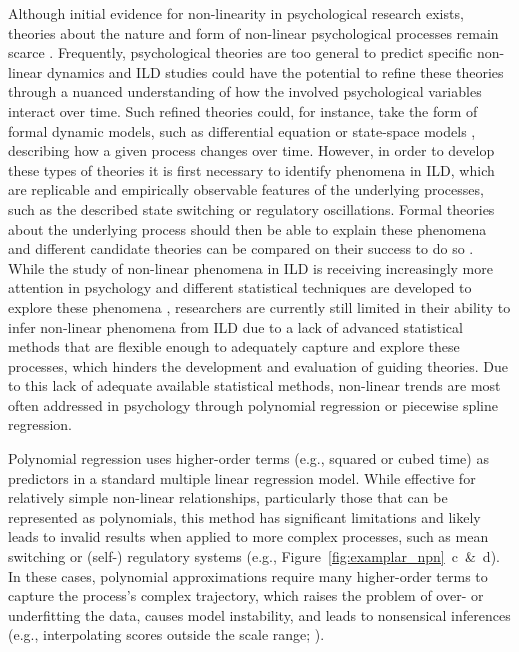\documentclass[man, floatsintext]{apa7}
\begin{document}
Although initial evidence for non-linearity in psychological research exists,
theories about the nature and form of non-linear psychological processes remain
scarce \parencite{tan_time-varying_2011}. Frequently, psychological theories
are too general \parencite{oberauer_addressing_2019} to predict specific
non-linear dynamics and ILD studies could have the
potential to refine these theories through a nuanced understanding of how the
involved psychological variables interact over time. Such refined
theories could, for instance, take the form of formal dynamic models, such as
differential equation \parencite{cooper_dynamical_2012} or state-space models
\parencite{durbin_time_2012}, describing how a given process changes over time.
However, in order to develop these types of theories it is first necessary to
identify phenomena in ILD, which are replicable and empirically observable
features of the underlying processes, such as the described state switching or
regulatory oscillations. Formal theories about the underlying process should
then be able to explain these phenomena and different candidate theories can be
compared on their success to do so \parencite{borsboom_theory_2021}. While the
study of non-linear phenomena in ILD is receiving increasingly more attention
in psychology and different statistical techniques are developed to explore
these phenomena \parencite{cui_unlocking_2023,humberg_estimating_2024},
researchers are currently still limited in their ability to infer non-linear
phenomena from ILD due to a lack of advanced statistical methods that are
flexible enough to adequately capture and explore these processes, which
hinders the development and evaluation of guiding theories. Due to this lack of
adequate available statistical methods, non-linear trends are most often
addressed in psychology through polynomial regression or
piecewise spline regression.

Polynomial regression \parencite{jebb_time_2015} uses higher-order terms (e.g.,
squared or cubed time) as predictors in a standard multiple linear regression
model. While effective for relatively simple non-linear relationships,
particularly those that can be represented as polynomials, this method has
significant limitations and likely leads to invalid results when applied to
more complex processes, such as mean switching or (self-) regulatory
systems (e.g., Figure~\ref{fig:examplar_npn}~c~\&~d). In these cases,
polynomial approximations require many higher-order terms to capture the
process's complex trajectory, which raises the problem of over- or underfitting
the data, causes model instability, and leads to nonsensical inferences (e.g.,
interpolating scores outside the scale range;
\textcite{boyd_divergence_2009,harrell_general_2001}).
\end{document}
